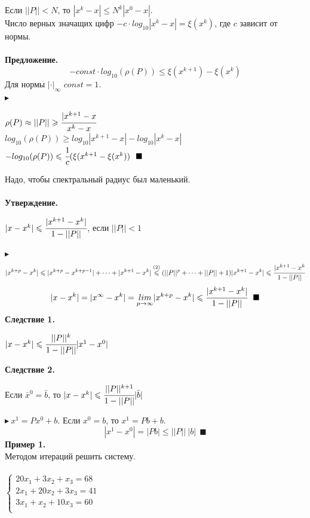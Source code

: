 \documentclass[12pt]{article}
\theoremstyle{definition}
\numberwithin{equation}{section}
\begin{document}
Если $||P||<N$, то $|x^k-x|\leqslant N^k|x^0-x|$.\\
Число верных значащих цифр $-c\cdot log_{10}|x^k-x|=\xi(x^k)$, где $c$ зависит от нормы.\\ \\
\textbf{Предложение.} 
$$-const\cdot log_{10}(\rho(P))\leqslant \xi(x^{k+1})-\xi(x^k)$$
Для нормы $|\cdot|_{\infty}$ $const=1$.\\
$\blacktriangleright$\begin{center}
$\rho(P) \approx ||P|| \geqslant \cfrac{|x^{k+1}-x}{x^k-x}$\\
$log_{10}(\rho(P))\geqslant log_{10}|x^{k+1}-x|-log_{10}|x^k-x|$\\
$-log_{10}(\rho(P))\leqslant\cfrac{1}{c}(\xi(x^{k+1}-\xi(x^k))~~\blacksquare$
\end{center}
Надо, чтобы спектральный радиус был маленький.\\ \\
\textbf{Утверждение.} 
\begin{center}
$|x-x^k|\leqslant \cfrac{|x^{k+1}-x^k|}{1-||P||}$, если $||P||<1$
\end{center}
$\blacktriangleright$ $$|x^{k+p}-x^k|\leqslant|x^{k+p}-x^{k+p-1}|+\cdots+|x^{k+1}-x^k|\overset{(2)}{\leqslant}(||P||^p+\cdots+||P||+1)|x^{k+1}-x^k|\leqslant\cfrac{|x^{k+1}-x^k}{1-||P||}$$
$$|x-x^k|=|x^{\infty}-x^k|=\underset{p\to \infty}{lim}|x^{k+p}-x^k|\leqslant\cfrac{|x^{k+1}-x^k|}{1-||P||}~~\blacksquare$$
\textbf{Следствие 1.}
\begin{center}
$|x-x^k|\leqslant \cfrac{||P||^k}{1-||P||}|x^1-x^0|$
\end{center}
\textbf{Следствие 2.}
\begin{center}
Если $\bar x^0=\bar b$, то $|x-x^k|\leqslant \cfrac{||P||^{k+1}}{1-||P||}|\bar b|$
\end{center}
$\blacktriangleright~x^1=Px^0+b$. Если $x^0=b$, то $x^1=Pb+b$.\\
$$|x^1-x^0|=|Pb|\leqslant||P||~|b|~~\blacksquare$$
\textbf{Пример 1.}\\
Методом итераций решить систему.\\ \\
$
\left\{
\begin{array}{lcl}
    20x_1+3x_2+x_3=68\\
    2x_1+20x_2+3x_3=41\\
    3x_1+x_2+10x_3=60\\
\end{array}
\right.
$
\\
\\
\end{document}
